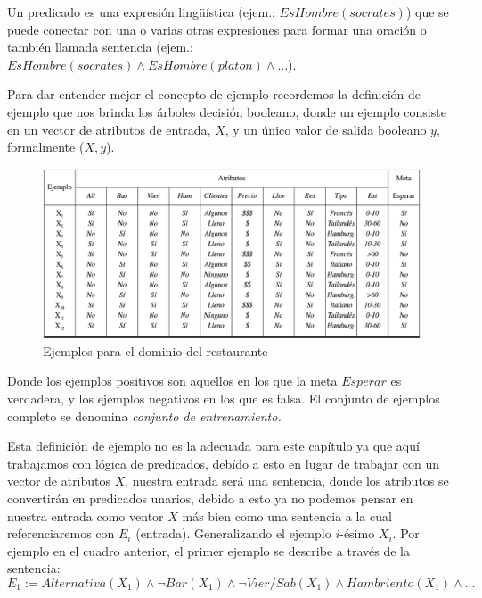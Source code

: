 \documentclass[12 pt, a4paper]{article}
\begin{document}
		Un predicado es una expresión lingüística (ejem.: \(EsHombre(socrates)\)) que se puede conectar con una o varias otras expresiones para formar una oración o también llamada sentencia (ejem.: \(EsHombre(socrates) \land EsHombre(platon)\land ...\)).
		
		
		Para dar entender mejor el concepto de ejemplo recordemos la definición de ejemplo que nos brinda los árboles decisión booleano, donde un ejemplo consiste en un vector de atributos de entrada, \(X\), y un único valor de salida booleano \(y\), formalmente (\(X, y\)).
		
		\begin{figure}[h]
			\includegraphics[width=\textwidth]{EjemploDT.png}
			\caption{Ejemplos para el dominio del restaurante}	
		\end{figure}
		Donde los ejemplos positivos son aquellos en los que la meta \(Esperar\) es verdadera, y los ejemplos negativos en los que es falsa. El conjunto de ejemplos completo se denomina \emph{conjunto de entrenamiento.}
		
		Esta definición de ejemplo no es la adecuada para este capítulo ya que aquí trabajamos con lógica de predicados, debído a esto en lugar de trabajar con un vector de atributos \(X\), nuestra entrada será una sentencia, donde los atributos se convertirán en predicados unarios, debido a esto ya no podemos pensar en nuestra entrada como ventor \(X\) más bien como una sentencia a la cual referenciaremos con \(E_{i}\) (entrada). Generalizando el ejemplo \(i\)-ésimo \(X_{i}\). Por ejemplo en el cuadro anterior, el primer ejemplo se describe a través de la sentencia:
			\[E_{1}:=Alternativa(X_{1}) \land \neg Bar(X_{1}) \land \neg Vier/Sab(X_{1}) \land Hambriento(X_{1}) \land ... \]
		
\end{document}
